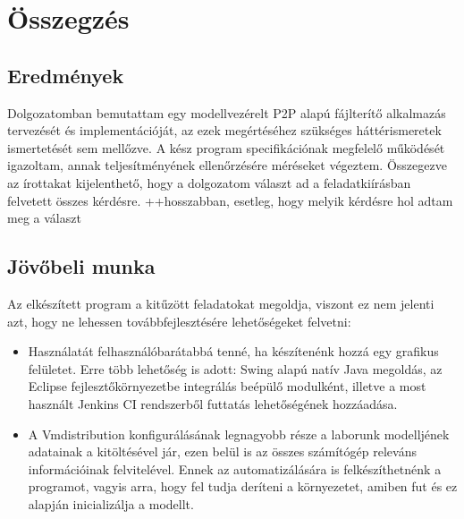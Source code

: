 \chapter{Összegzés}
\label{chp:summary}

\section{Eredmények}
Dolgozatomban bemutattam egy modellvezérelt P2P alapú fájlterítő alkalmazás tervezését és implementációját, az ezek megértéséhez szükséges háttérismeretek ismertetését sem mellőzve. A kész program specifikációnak megfelelő működését igazoltam, annak teljesítményének ellenőrzésére méréseket végeztem. Összegezve az írottakat kijelenthető, hogy a dolgozatom választ ad a feladatkiírásban felvetett összes kérdésre.
++hosszabban, esetleg, hogy melyik kérdésre hol adtam meg a választ

\section{Jövőbeli munka}
Az elkészített program a kitűzött feladatokat megoldja, viszont ez nem jelenti azt, hogy ne lehessen továbbfejlesztésére lehetőségeket felvetni:
\begin{itemize}
  \item Használatát felhasználóbarátabbá tenné, ha készítenénk hozzá egy grafikus felületet. Erre több lehetőség is adott: Swing\cite{zukowski2005definitive} alapú natív Java megoldás, az Eclipse fejlesztőkörnyezetbe integrálás beépülő modulként, illetve a most használt Jenkins CI rendszerből futtatás lehetőségének hozzáadása.
  \item A Vmdistribution konfigurálásának legnagyobb része a laborunk modelljének adatainak a kitöltésével jár, ezen belül is az összes számítógép releváns információinak felvitelével. Ennek az automatizálására is felkészíthetnénk a programot, vagyis arra, hogy fel tudja deríteni a környezetet, amiben fut és ez alapján inicializálja a modellt.
\end{itemize}
